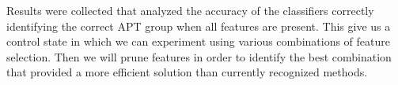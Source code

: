 \documentclass[12pt]{report}
\begin{document}
Results were collected that analyzed the accuracy of the classifiers correctly identifying the correct APT group when all features are present.  This give us a control state in which we can experiment using various combinations of feature selection. Then we will prune features in order to identify the best combination that provided a more efficient solution than currently recognized methods.

\end{document}
